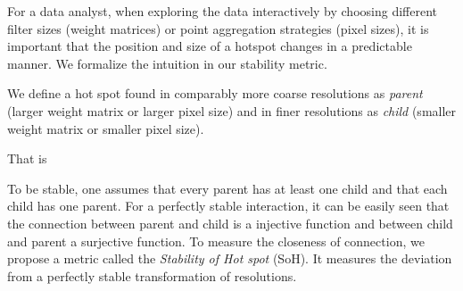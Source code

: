 \documentclass{itatnew}
\begin{document}


For a data analyst, when exploring the data interactively by choosing different
filter sizes (weight matrices) or point aggregation strategies (pixel sizes), it
is important that the position and size of a hotspot changes in a predictable
manner. We formalize the intuition in our stability metric.

%
%
%  


We define a hot spot found in comparably more coarse resolutions as
\emph{parent} (larger weight matrix or larger pixel size) and in finer
resolutions as \emph{child} (smaller weight matrix or smaller pixel size).

That is 

To be stable, one assumes that every parent has at
least one child and that each child has one parent. For a perfectly stable
interaction, it can be easily seen that the connection between parent and child
is a injective function and between child and parent a surjective function. To
measure the closeness of connection, we propose a metric called the
\emph{Stability of Hot spot} (SoH). It measures the deviation from a perfectly
stable transformation of resolutions.
\end{document}
